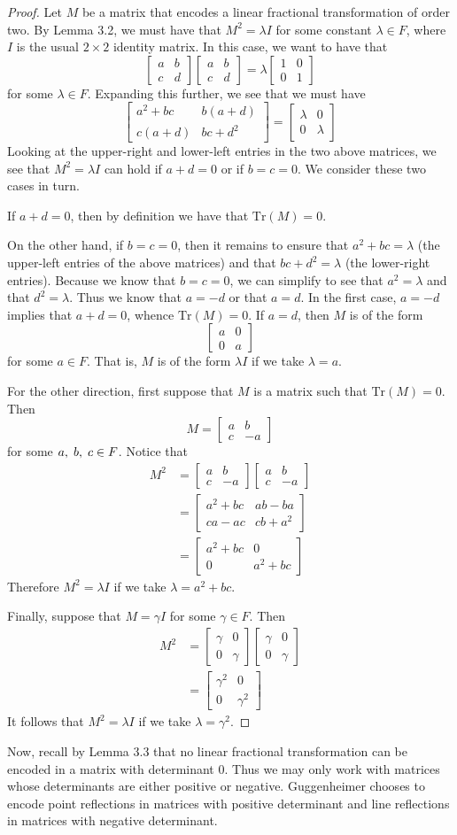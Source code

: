 \documentclass[12pt]{article}
\newcommand{\lftmat}[4]{\begin{bmatrix} {#1} & {#2} \\ {#3} & {#4} \end{bmatrix}}
\newcommand{\stanlftmat}{\lftmat{a}{b}{c}{d}}
\newcommand{\ttc}{, \hspace{1mm}}
\newcommand{\Tr}{\text{Tr}}
\theoremstyle{plain}
\theoremstyle{definition}
\begin{document}
\begin{proof}
Let $M$ be a matrix that encodes a linear fractional transformation of order two. By Lemma 3.2, we must have that $M^2 = \lambda I$ for some constant $\lambda \in F$, where $I$ is the usual $2 \times 2$ identity matrix. In this case, we want to have that 
	\[
		\stanlftmat \stanlftmat = \lambda \lftmat{1}{0}{0}{1}
	\]
for some $\lambda \in F$. Expanding this further, we see that we must have 
	\[
		\lftmat{a^2 + bc}{b(a+d)}{c(a+d)}{bc+d^2} =  \lftmat{\lambda}{0}{0}{\lambda}
	\]
Looking at the upper-right and lower-left entries in the two above matrices, we see that $M^2 = \lambda I$ can hold if $a + d = 0$ or if $b = c = 0$. We consider these two cases in turn.

If $a + d = 0$, then by definition we have that $\Tr(M) = 0$.

On the other hand, if $b = c = 0$, then it remains to ensure that $a^2 + bc = \lambda$ (the upper-left entries of the above matrices) and that $bc + d^2 = \lambda$ (the lower-right entries). Because we know that $b = c = 0$, we can simplify to see that $a^2 = \lambda$ and that $d^2 = \lambda$. Thus we know that $a = -d$ or that $a = d$. In the first case, $a = -d$ implies that $a + d = 0$, whence $\Tr(M) = 0$. If $a = d$, then $M$ is of the form 
\[\lftmat{a}{0}{0}{a}\]
for some $a \in F$. That is, $M$ is of the form $\lambda I$ if we take $\lambda = a$. 

For the other direction, first suppose that $M$ is a matrix such that $\Tr(M) = 0$. Then
\[M = \lftmat{a}{b}{c}{-a}\]
for some $a \ttc b \ttc c \in F$. Notice that
\begin{align*}
M^2 & = \lftmat{a}{b}{c}{-a} \lftmat{a}{b}{c}{-a} \\[2ex]
& = \lftmat{a^2+bc}{ab - ba}{ca - ac}{cb+a^2} \\[2ex]
& = \lftmat{a^2+bc}{0}{0}{a^2 + bc}
\end{align*}
Therefore $M^2 = \lambda I$ if we take $\lambda = a^2 + bc$.

Finally, suppose that $M = \gamma I$ for some $\gamma \in F$. Then
\begin{align*}
M^2 & = \lftmat{\gamma}{0}{0}{\gamma} \lftmat{\gamma}{0}{0}{\gamma} \\[2ex]
& = \lftmat{\gamma^2}{0}{0}{\gamma^2}
\end{align*}
It follows that $M^2 = \lambda I$ if we take $\lambda = \gamma^2$.
\end{proof}

Now, recall by Lemma 3.3 that no linear fractional transformation can be encoded in a matrix with determinant 0. Thus we may only work with matrices whose determinants are either positive or negative. Guggenheimer chooses to encode point reflections in matrices with positive determinant and line reflections in matrices with negative determinant. 
\end{document}
